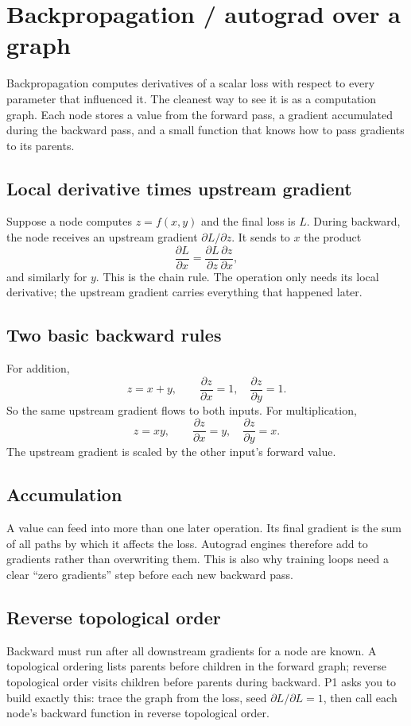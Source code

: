 \section{Backpropagation / autograd over a graph}\label{sec:05}

Backpropagation computes derivatives of a scalar loss with respect to every
parameter that influenced it. The cleanest way to see it is as a computation
graph. Each node stores a value from the forward pass, a gradient accumulated
during the backward pass, and a small function that knows how to pass gradients
to its parents.

\subsection*{Local derivative times upstream gradient}
Suppose a node computes $z=f(x,y)$ and the final loss is $L$. During backward,
the node receives an upstream gradient $\partial L/\partial z$. It sends to $x$
the product
\[
  \frac{\partial L}{\partial x}
  =
  \frac{\partial L}{\partial z}
  \frac{\partial z}{\partial x},
\]
and similarly for $y$. This is the chain rule. The operation only needs its
local derivative; the upstream gradient carries everything that happened later.

\subsection*{Two basic backward rules}
For addition,
\[
  z = x + y,
  \qquad
  \frac{\partial z}{\partial x}=1,
  \quad
  \frac{\partial z}{\partial y}=1.
\]
So the same upstream gradient flows to both inputs. For multiplication,
\[
  z = xy,
  \qquad
  \frac{\partial z}{\partial x}=y,
  \quad
  \frac{\partial z}{\partial y}=x.
\]
The upstream gradient is scaled by the other input's forward value.

\subsection*{Accumulation}
A value can feed into more than one later operation. Its final gradient is the
sum of all paths by which it affects the loss. Autograd engines therefore add
to gradients rather than overwriting them. This is also why training loops need
a clear ``zero gradients'' step before each new backward pass.

\subsection*{Reverse topological order}
Backward must run after all downstream gradients for a node are known. A
topological ordering lists parents before children in the forward graph; reverse
topological order visits children before parents during backward. P1 asks you to
build exactly this: trace the graph from the loss, seed
$\partial L/\partial L = 1$, then call each node's backward function in reverse
topological order.

